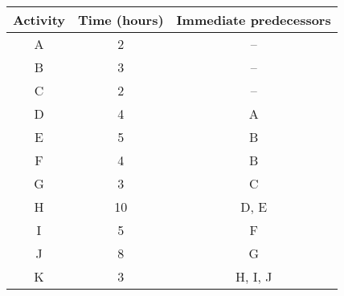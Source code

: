     \begin{tabular}{|c|c|c|}
        \hline
        \textbf{Activity} & \textbf{Time (hours)} & \textbf{Immediate predecessors} \\
        \hline
        A & 2 & -- \\
        \hline
        B & 3 & -- \\
                \hline
        C & 2 & -- \\
        \hline
        D & 4 & A \\
        \hline
        E & 5 & B \\
        \hline
        F & 4 & B \\
        \hline
        G & 3 & C \\
        \hline
        H & 10 & D, E \\
        \hline
        I & 5 & F \\
        \hline
        J & 8 & G \\
        \hline
        K & 3 & H, I, J \\
        \hline
    \end{tabular}

